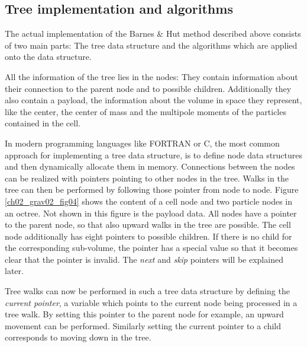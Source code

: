 \subsection{Tree implementation and algorithms}
The actual implementation of the Barnes \& Hut method described above consists of two main parts: The tree data structure and the algorithms which are applied onto the data structure.

All the information of the tree lies in the nodes: They contain information about their connection to the parent node and to possible children. Additionally they also contain a payload, the information about the volume in space they represent, like the center, the center of mass and the multipole moments of the particles contained in the cell. 

In modern programming languages like FORTRAN or C, the most common approach for implementing a tree data structure, is to define node data structures and then dynamically allocate them in memory. Connections between the nodes can be realized with pointers pointing to other nodes in the tree. Walks in the tree can then be performed by following those pointer from node to node. Figure \ref{ch02_grav02_fig04} shows the content of a cell node and two particle nodes in an octree. Not shown in this figure is the payload data. All nodes have a pointer to the parent node, so that also upward walks in the tree are possible. The cell node additionally has eight pointers to possible children. If there is no child for the corresponding sub-volume, the pointer has a special value so that it becomes clear that the pointer is invalid. The \emph{next} and \emph{skip} pointers will be explained later.

Tree walks can now be performed in such a tree data structure by defining the \emph{current pointer}, a variable which points to the current node being processed in a tree walk. By setting this pointer to the parent node for example, an upward movement can be performed. Similarly setting the current pointer to a child corresponds to moving down in the tree.

